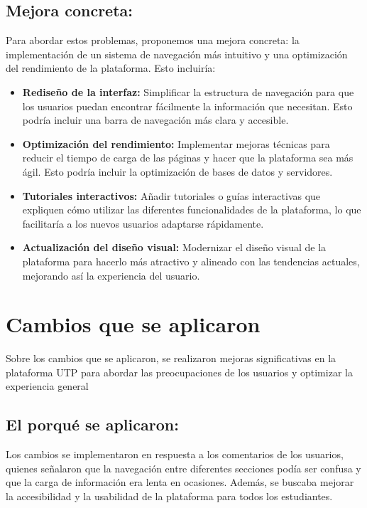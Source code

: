 \documentclass{article}
\begin{document}
\subsection*{Mejora concreta:}
Para abordar estos problemas, proponemos una mejora concreta: la implementación de un sistema de navegación más intuitivo y una optimización del rendimiento de la plataforma. Esto incluiría:
\begin{itemize}
  \item \textbf{Rediseño de la interfaz:} Simplificar la estructura de navegación para que los usuarios puedan encontrar fácilmente la información que necesitan. Esto podría incluir una barra de navegación más clara y accesible.
  \item \textbf{Optimización del rendimiento:} Implementar mejoras técnicas para reducir el tiempo de carga de las páginas y hacer que la plataforma sea más ágil. Esto podría incluir la optimización de bases de datos y servidores.
  \item \textbf{Tutoriales interactivos:} Añadir tutoriales o guías interactivas que expliquen cómo utilizar las diferentes funcionalidades de la plataforma, lo que facilitaría a los nuevos usuarios adaptarse rápidamente.
  \item \textbf{Actualización del diseño visual:} Modernizar el diseño visual de la plataforma para hacerlo más atractivo y alineado con las tendencias actuales, mejorando así la experiencia del usuario.
  \end{itemize}
  
\newpage

\section{Cambios que se aplicaron}

Sobre los cambios que se aplicaron, se realizaron mejoras significativas en la plataforma UTP para abordar las preocupaciones de los usuarios y optimizar la experiencia general

\subsection*{El porqué se aplicaron:}

Los cambios se implementaron en respuesta a los comentarios de los usuarios, quienes señalaron que la navegación entre diferentes secciones podía ser confusa y que la carga de información era lenta en ocasiones. Además, se buscaba mejorar la accesibilidad y la usabilidad de la plataforma para todos los estudiantes.
\end{document}
